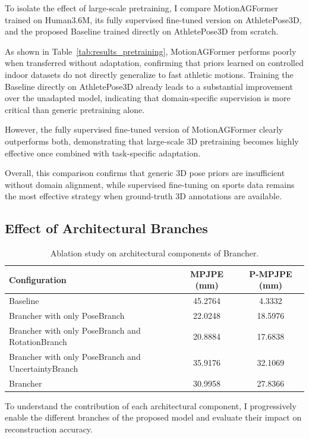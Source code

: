 To isolate the effect of large-scale pretraining, I compare MotionAGFormer trained on Human3.6M, its fully supervised fine-tuned version on AthletePose3D, and the proposed Baseline trained directly on 
AthletePose3D from scratch.

As shown in Table~\ref{tab:results_pretraining}, MotionAGFormer performs poorly when transferred without adaptation, confirming that priors learned on controlled indoor datasets do not directly generalize 
to fast athletic motions. Training the Baseline directly on AthletePose3D already leads to a substantial improvement over the unadapted model, indicating that domain-specific supervision is more critical 
than generic pretraining alone.

However, the fully supervised fine-tuned version of MotionAGFormer clearly outperforms both, demonstrating that large-scale 3D pretraining becomes highly effective once combined with task-specific adaptation.

Overall, this comparison confirms that generic 3D pose priors are insufficient without domain alignment, while supervised fine-tuning on sports data remains the most effective strategy when ground-truth 
3D annotations are available.

\subsection{Effect of Architectural Branches}
\begin{table}[H]
\centering
\caption{Ablation study on architectural components of Brancher.}
\label{tab:ablation_branches}
\begin{tabular}{lcc}
\hline
Configuration & MPJPE (mm) & P-MPJPE (mm) \\
\hline
Baseline & 45.2764 & 4.3332 \\
Brancher with only PoseBranch & 22.0248 & 18.5976 \\
Brancher with only PoseBranch and RotationBranch & 20.8884 & 17.6838 \\
Brancher with only PoseBranch and UncertaintyBranch & 35.9176 & 32.1069 \\
Brancher & 30.9958 & 27.8366 \\
\hline
\end{tabular}
\end{table}

To understand the contribution of each architectural component, I progressively enable the different branches of the proposed model and evaluate their impact on reconstruction accuracy.

